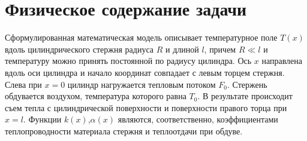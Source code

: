 \section{Физическое содержание задачи}
Сформулированная математическая модель описывает температурное поле $T(x)$ вдоль цилиндрического стержня радиуса $R$ и длиной $l$, причем $R \ll l$ и температуру можно принять постоянной по радиусу цилиндра. Ось $x$ направлена вдоль оси цилиндра и начало координат совпадает с левым торцем стержня. Слева при $x = 0$ цилиндр нагружается тепловым потоком $F_0$. Стержень обдувается воздухом, температура которого равна $T_0$. В результате происходит съем тепла с цилиндрической поверхности и поверхности правого торца при $x = l$. Функции $k(x)$,$\alpha(x)$ являются, соответственно, коэффициентами теплопроводности материала стержня и теплоотдачи при обдуве.


